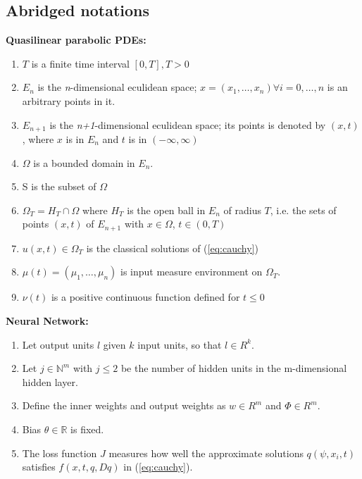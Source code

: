 \documentclass{article}
\begin{document}
	\subsection{Abridged notations}
	\textbf{Quasilinear parabolic PDEs:}
	\begin{enumerate}
			\item $T$ is a finite time interval $[0,T], T>0$
		\item $E_{n}$ is the \textit{n}-dimensional eculidean space; $x = (x_1, \dots , x_n) \forall i = 0, \dots, n$ is an arbitrary points in it.
		\item $E_{n+1}$ is the \textit{n+1}-dimensional eculidean space;
		its points is denoted by $(x,t)$, where $x$ is in $E_{n}$ and $t$ is in $(- \infty, \infty)$
		\item $\Omega$ is a bounded domain in $E_{n}$.
		\item S is the subset of $\Omega$
		\item $\Omega_{T} = H_{T} \cap \Omega$ where $H_{T}$ is the open ball in $E_{n}$ of radius $T$, i.e. the sets of points $(x,t)$ of $E_{n+1}$ with $x \in \Omega$, $t \in (0,T)$
		\item $u(x,t) \in \Omega_{T}$ is the classical solutions of (\ref{eq:cauchy})
		\item $\mu(t)=(\mu_1, \dots, \mu_{n})$ is input measure environment on $\Omega_{T}$.
		\item $\nu(t)$ is a positive continuous function defined for $t \leq 0$
	\end{enumerate}
	\textbf{Neural Network:}
	\begin{enumerate}
		\item Let output units $\textit{l}$ given $k$ input units, so that $\textit{l} \in R^{k}$.
		\item Let $j \in \mathbb{N}^m$ with $j \leq 2$ be the number of hidden units in the m-dimensional hidden layer.
		\item Define the inner weights and output weights as $w \in R^m$ and $\Phi \in R^m$.
		\item Bias $\theta \in \mathbb{R}$ is fixed.
		\item The loss function $J$ measures how well the approximate solutions $q(\psi,x_i,t)$ satisfies $f(x,t,q,Dq)$ in (\ref{eq:cauchy}).
\end{enumerate}
\end{document}
